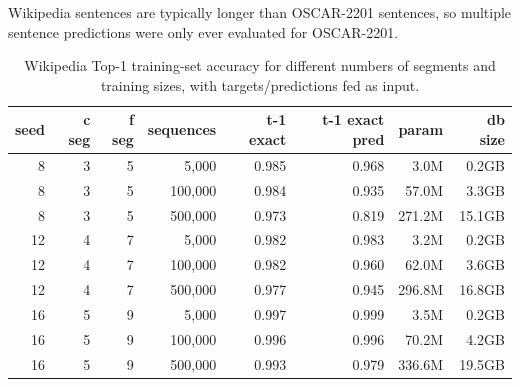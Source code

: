 Wikipedia sentences are typically longer than OSCAR-2201 sentences, so multiple sentence predictions were only ever evaluated for OSCAR-2201.


\begin{table}[H]
\centering
\caption{Wikipedia Top-1 training-set accuracy for different numbers of segments and training sizes, with targets/predictions fed as input.}
\label{tab:wiki-train-top1-accuracy}
\begin{tabular}{rrrrrrrr}
\toprule
\textbf{seed} & \textbf{c seg} & \textbf{f seg} & \textbf{sequences} & \textbf{t-1 exact} & \textbf{t-1 exact pred} & \textbf{param} & \textbf{db size} \\
\midrule
8  & 3 & 5 & 5,000   & 0.985 & 0.968 & 3.0M & 0.2GB \\
8  & 3 & 5 & 100,000 & 0.984 & 0.935 & 57.0M & 3.3GB \\
8  & 3 & 5 & 500,000 & 0.973 & 0.819 & 271.2M & 15.1GB \\
12 & 4 & 7 & 5,000   & 0.982 & 0.983 & 3.2M & 0.2GB \\
12 & 4 & 7 & 100,000 & 0.982 & 0.960 & 62.0M & 3.6GB \\
12 & 4 & 7 & 500,000 & 0.977 & 0.945 & 296.8M & 16.8GB \\
16 & 5 & 9 & 5,000   & 0.997 & 0.999 & 3.5M & 0.2GB \\
16 & 5 & 9 & 100,000 & 0.996 & 0.996 & 70.2M & 4.2GB \\
16 & 5 & 9 & 500,000 & 0.993 & 0.979 & 336.6M & 19.5GB \\
\bottomrule
\end{tabular}
\end{table}




